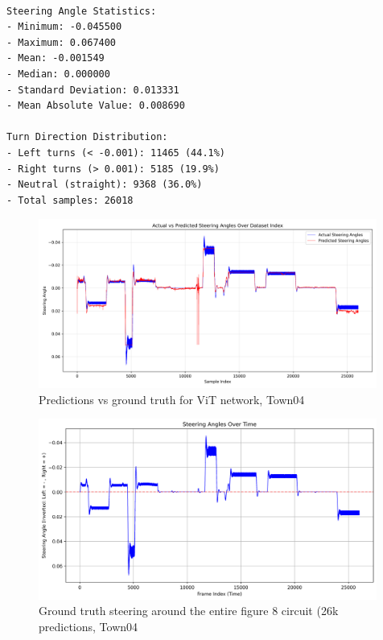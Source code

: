 \begin{verbatim}

Steering Angle Statistics:
- Minimum: -0.045500
- Maximum: 0.067400
- Mean: -0.001549
- Median: 0.000000
- Standard Deviation: 0.013331
- Mean Absolute Value: 0.008690

Turn Direction Distribution:
- Left turns (< -0.001): 11465 (44.1%)
- Right turns (> 0.001): 5185 (19.9%)
- Neutral (straight): 9368 (36.0%)
- Total samples: 26018

\end{verbatim}

\begin{figure}[h]
    \centering
    \includegraphics[width=0.99\textwidth]{Figures/Methods/predictions_vs_labels_vit.png}
    \caption{Predictions vs ground truth for ViT network, Town04}
    \label{fig:/predictions_vs_labels_vit}
\end{figure}


\begin{figure}[h]
    \centering
    \includegraphics[width=0.99\textwidth]{Figures/Methods/steering_angles_town04.png}
    \caption{Ground truth steering around the entire figure 8 circuit (26k predictions, Town04}
    \label{fig:/steering_angles_town04}
\end{figure}

